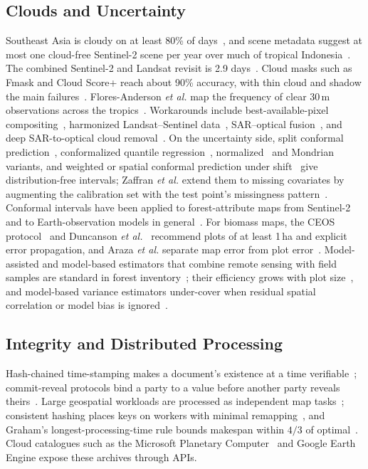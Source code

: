 \documentclass[conference,a4paper]{IEEEtran}
\begin{document}
\subsection{Clouds and Uncertainty}
Southeast Asia is cloudy on at least 80\% of days~\cite{wilson2016cloud}, and scene metadata suggest at most one cloud-free Sentinel-2 scene per year over much of tropical Indonesia~\cite{sudmanns2020eocompass}. The combined Sentinel-2 and Landsat revisit is 2.9 days~\cite{li2017revisit}. Cloud masks such as Fmask and Cloud Score+ reach about 90\% accuracy, with thin cloud and shadow the main failures~\cite{zhu2012fmask,skakun2022cmix,pasquarella2023cloudscore}. Flores-Anderson \textit{et al.} map the frequency of clear 30\,m observations across the tropics~\cite{floresanderson2023clear}. Workarounds include best-available-pixel compositing~\cite{white2014pixel}, harmonized Landsat--Sentinel data~\cite{claverie2018hls}, SAR--optical fusion~\cite{reiche2016combining}, and deep SAR-to-optical cloud removal~\cite{meraner2020cloud}. On the uncertainty side, split conformal prediction~\cite{lei2018distribution}, conformalized quantile regression~\cite{romano2019cqr}, normalized~\cite{papadopoulos2008normalized} and Mondrian~\cite{bostrom2020mondrian} variants, and weighted or spatial conformal prediction under shift~\cite{tibshirani2019conformal,mao2024spatial} give distribution-free intervals; Zaffran \textit{et al.} extend them to missing covariates by augmenting the calibration set with the test point's missingness pattern~\cite{zaffran2023conformal}. Conformal intervals have been applied to forest-attribute maps from Sentinel-2~\cite{kuronen2025uncertainty} and to Earth-observation models in general~\cite{singh2024uncertainty}. For biomass maps, the CEOS protocol~\cite{duncanson2021ceos} and Duncanson \textit{et al.}~\cite{duncanson2019importance} recommend plots of at least 1\,ha and explicit error propagation, and Araza \textit{et al.} separate map error from plot error~\cite{araza2022comprehensive}. Model-assisted and model-based estimators that combine remote sensing with field samples are standard in forest inventory~\cite{cochran1977sampling,sarndal1992model,stahl2016models}; their efficiency grows with plot size~\cite{mauya2015effects}, and model-based variance estimators under-cover when residual spatial correlation or model bias is ignored~\cite{breidenbach2016empirical,wadoux2025scientists}.

\subsection{Integrity and Distributed Processing}
Hash-chained time-stamping makes a document's existence at a time verifiable~\cite{haber1991timestamp}; commit-reveal protocols bind a party to a value before another party reveals theirs~\cite{blum1983coin}. Large geospatial workloads are processed as independent map tasks~\cite{dean2008mapreduce}; consistent hashing places keys on workers with minimal remapping~\cite{karger1997consistent}, and Graham's longest-processing-time rule bounds makespan within $4/3$ of optimal~\cite{graham1969bounds}. Cloud catalogues such as the Microsoft Planetary Computer~\cite{mpc2022} and Google Earth Engine expose these archives through APIs.
\end{document}
